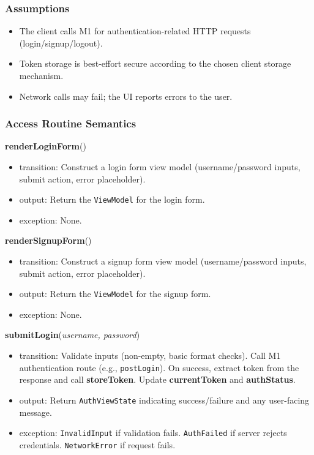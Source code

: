 \documentclass[12pt, titlepage]{article}
\begin{document}
\subsubsection{Assumptions}
\begin{itemize}
    \item The client calls M1 for authentication-related HTTP requests (login/signup/logout).
    \item Token storage is best-effort secure according to the chosen client storage mechanism.
    \item Network calls may fail; the UI reports errors to the user.
\end{itemize}

\subsubsection{Access Routine Semantics}

\noindent\textbf{renderLoginForm}()
\begin{itemize}
    \item transition: Construct a login form view model (username/password inputs, submit action, error placeholder).
    \item output: Return the \texttt{ViewModel} for the login form.
    \item exception: None.
\end{itemize}

\noindent\textbf{renderSignupForm}()
\begin{itemize}
    \item transition: Construct a signup form view model (username/password inputs, submit action, error placeholder).
    \item output: Return the \texttt{ViewModel} for the signup form.
    \item exception: None.
\end{itemize}

\noindent\textbf{submitLogin}(\textit{username, password})
\begin{itemize}
    \item transition: Validate inputs (non-empty, basic format checks). Call M1 authentication route (e.g., \texttt{postLogin}). On success, extract token from the response and call \textbf{storeToken}. Update \textbf{currentToken} and \textbf{authStatus}.
    \item output: Return \texttt{AuthViewState} indicating success/failure and any user-facing message.
    \item exception: \texttt{InvalidInput} if validation fails. \texttt{AuthFailed} if server rejects credentials. \texttt{NetworkError} if request fails.
\end{itemize}
\end{document}
